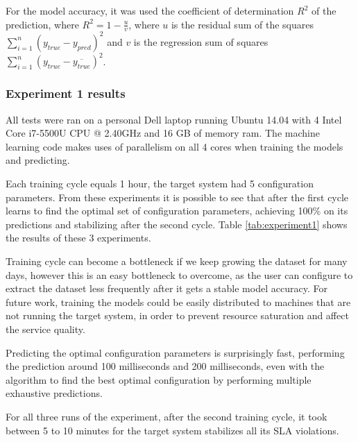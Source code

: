 For the model accuracy, it was used the coefficient of determination $R^2$ of the prediction, where $R^2 = 1 - \frac{u}{v}$, where $u$ is the residual sum of the squares  $\sum_{i=1}^{n}(y_{true} - y_{pred})^2$ and $v$ is the regression sum of squares $\sum_{i=1}^{n}(y_{true} - \overline{y_{true}})^2$.

\subsubsection{Experiment 1 results}

All tests were ran on a personal Dell laptop running Ubuntu 14.04 with 4 Intel Core i7-5500U CPU @ 2.40GHz and 16 GB of memory ram. The machine learning code makes uses of parallelism on all 4 cores when training the models and predicting.

Each training cycle equals 1 hour, the target system had 5 configuration parameters. From these experiments it is possible to see that after the first cycle \projectname{} learns to find the optimal set of configuration parameters, achieving 100\% on its predictions and stabilizing after the second cycle. Table \ref{tab:experiment1} shows the results of these 3 experiments.

Training cycle can become a bottleneck if we keep growing the dataset for many days, however this is an easy bottleneck to overcome, as the user can configure \projectname{} to extract the dataset less frequently after it gets a stable model accuracy. For future work, training the models could be easily distributed to machines that are not running the target system, in order to prevent resource saturation and affect the service quality.

Predicting the optimal configuration parameters is surprisingly fast, performing the prediction around 100 milliseconds and 200 milliseconds, even with the algorithm to find the best optimal configuration by performing multiple exhaustive predictions.

For all three runs of the experiment, after the second training cycle, it took between 5 to 10 minutes for the target system stabilizes all its SLA violations.

